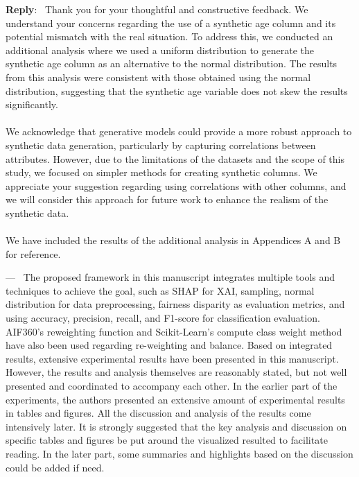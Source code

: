 \documentclass[11pt]{article}
\newcounter{reviewer}
\newcounter{point}[reviewer]
\renewcommand{\thepoint}{Comment\,\thereviewer.\arabic{point}}
\newenvironment{point}
   {\refstepcounter{point} \bigskip \noindent {\textbf{Reviewer~\thepoint} } ---\ }
   {\par }
\newenvironment{reply}
   {\medskip \noindent \color{blue} \begin{sf}\textbf{Reply}:\  }
   {\medskip \par \end{sf}}
\begin{document}
\begin{reply}
 Thank you for your thoughtful and constructive feedback. We understand your concerns regarding the use of a synthetic age column and its potential mismatch with the real situation. To address this, we conducted an additional analysis where we used a uniform distribution to generate the synthetic age column as an alternative to the normal distribution. The results from this analysis were consistent with those obtained using the normal distribution, suggesting that the synthetic age variable does not skew the results significantly.
\\
\\
We acknowledge that generative models could provide a more robust approach to synthetic data generation, particularly by capturing correlations between attributes. However, due to the limitations of the datasets and the scope of this study, we focused on simpler methods for creating synthetic columns. We appreciate your suggestion regarding using correlations with other columns, and we will consider this approach for future work to enhance the realism of the synthetic data.
\\
\\
We have included the results of the additional analysis in Appendices A and B for reference. 
\end{reply}


\begin{point}
\label{comment_22} The proposed framework in this manuscript integrates multiple tools and techniques to achieve the goal, such as SHAP for XAI, sampling, normal distribution for data preprocessing, fairness disparity as evaluation metrics, and using accuracy, precision, recall, and F1-score for classification evaluation. AIF360’s reweighting function and Scikit-Learn’s compute class weight method have also been used regarding re-weighting and balance. Based on integrated results, extensive experimental results have been presented in this manuscript. However, the results and analysis themselves are reasonably stated, but not well presented and coordinated to accompany each other. In the earlier part of the experiments, the authors presented an extensive amount of experimental results in tables and figures. All the discussion and analysis of the results come intensively later. It is strongly suggested that the key analysis and discussion on specific tables and figures be put around the visualized resulted to facilitate reading. In the later part, some summaries and highlights based on the discussion could be added if need.
\end{point}
\end{document}
